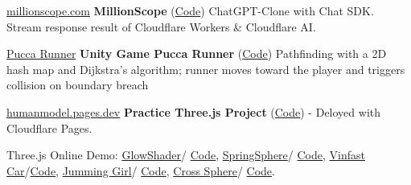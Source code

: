 \cvspace

\begin{twocolentry}{\href{https://millionscope.com}{millionscope.com}}
	\textbf{MillionScope}  (\href{https://github.com/millionscope/millionscope.github.io}{Code}) ChatGPT-Clone with Chat SDK. Stream response result of Cloudflare Workers \& Cloudflare AI.
\end{twocolentry}

\cvspace

\begin{twocolentry}{\href{https://puccarunner.github.io}{Pucca Runner}}
	\textbf{Unity Game Pucca Runner} (\href{https://github.com/hmthanh/pucca_runner}{Code}) Pathfinding with a 2D hash map and Dijkstra’s algorithm; runner moves toward the player and triggers collision on boundary breach
\end{twocolentry}


\cvspace
\begin{twocolentry}{\href{https://humanmodel.pages.dev}{humanmodel.pages.dev}}
	\textbf{Practice Three.js Project} (\href{https://github.com/openhuman-ai/humanmodel}{Code}) - Deloyed with Cloudflare Pages.
	
	
	Three.js Online Demo:
	\href{https://glowshader.vercel.app}{GlowShader}/ \href{https://github.com/hmthanh/GlowShader}{Code}, \href{https://springsphere.vercel.app}{SpringSphere}/
	\href{https://github.com/hmthanh/SpringSphere}{Code},
	\href{https://vinfast.vercel.app}{Vinfast Car}/\href{https://github.com/hmthanh/vinfastcar}{Code}, \href{https://jumming.vercel.app/}{Jumming Girl}/ \href{https://github.com/hmthanh/jumming-girl}{Code}, \href{https://crosssphere.vercel.app/}{Cross Sphere}/ \href{https://github.com/hmthanh/crosssphere}{Code}.
\end{twocolentry}



\cvspace

%	

